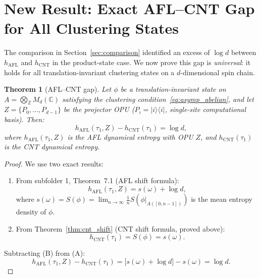 \documentclass[12pt,a4paper]{article}
\newtheorem{theorem}{Theorem}[section]
\newcommand{\CC}{\mathbb{C}}
\newcommand{\ZZ}{\mathbb{Z}}
\newcommand{\Md}{M_d(\CC)}
\begin{document}
\section{New Result: Exact AFL--CNT Gap for All Clustering States}
\label{sec:afl_cnt_gap}

The comparison in Section~\ref{sec:comparison} identified an excess of $\log d$
between $h_\mathrm{AFL}$ and $h_\mathrm{CNT}$ in the product-state case.
We now prove this gap is \emph{universal}: it holds for all translation-invariant
clustering states on a $d$-dimensional spin chain.

\begin{theorem}[AFL--CNT gap]\label{thm:afl_cnt_gap}
Let $\phi$ be a translation-invariant state on $A=\bigotimes_\ZZ\Md$ satisfying the
clustering condition~\eqref{eq:asymp_abelian}, and let $Z=\{P_0,\ldots,P_{d-1}\}$
be the projector OPU ($P_i=|i\rangle\langle i|$, single-site computational basis).
Then:
\begin{equation}\label{eq:afl_cnt_gap}
  h_\mathrm{AFL}(\tau_1, Z) - h_\mathrm{CNT}(\tau_1) = \log d,
\end{equation}
where $h_\mathrm{AFL}(\tau_1,Z)$ is the AFL dynamical entropy with OPU $Z$,
and $h_\mathrm{CNT}(\tau_1)$ is the CNT dynamical entropy.
\end{theorem}

\begin{proof}
We use two exact results:
\begin{enumerate}
\item[(A)] From subfolder 1, Theorem~7.1 (AFL shift formula):
  \begin{equation}\label{eq:afl_shift}
    h_\mathrm{AFL}(\tau_1, Z) = s(\omega) + \log d,
  \end{equation}
  where $s(\omega) = S(\phi) = \lim_{n\to\infty}\frac{1}{n}S(\phi|_{A([0,n-1])})$
  is the mean entropy density of $\phi$.
\item[(B)] From Theorem~\ref{thm:cnt_shift} (CNT shift formula, proved above):
  \begin{equation}\label{eq:cnt_shift_restate}
    h_\mathrm{CNT}(\tau_1) = S(\phi) = s(\omega).
  \end{equation}
\end{enumerate}
Subtracting (B) from (A):
\begin{equation}
  h_\mathrm{AFL}(\tau_1,Z) - h_\mathrm{CNT}(\tau_1)
  = \bigl[s(\omega)+\log d\bigr] - s(\omega) = \log d.
\end{equation}
\end{proof}
\end{document}

